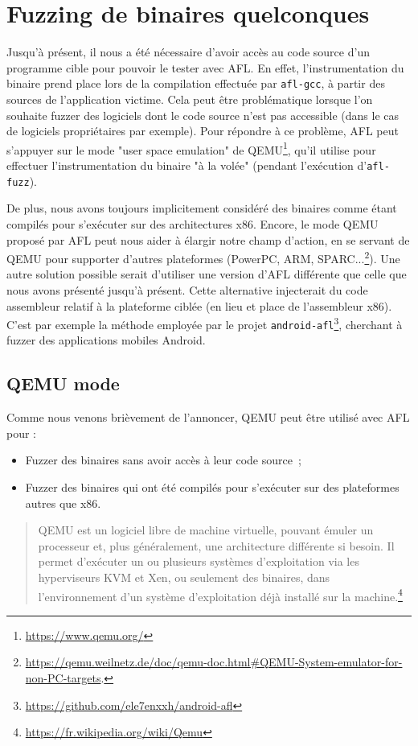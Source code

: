 \chapter{Fuzzing de binaires quelconques}

Jusqu'à présent, il nous a été nécessaire d'avoir accès au code source d'un programme cible pour pouvoir le tester avec AFL.
En effet, l'instrumentation du binaire prend place lors de la compilation effectuée par \lstinline{afl-gcc}, à partir des sources de l'application victime.
Cela peut être problématique lorsque l'on souhaite fuzzer des logiciels dont le code source n'est pas accessible (dans le cas de logiciels propriétaires par exemple).
Pour répondre à ce problème, AFL peut s'appuyer sur le mode "user space emulation" de QEMU\footnote{\url{https://www.qemu.org/}}, qu'il utilise pour effectuer l'instrumentation du binaire "à la volée" (pendant l'exécution d'\lstinline{afl-fuzz}).

De plus, nous avons toujours implicitement considéré des binaires comme étant compilés pour s'exécuter sur des architectures x86.
Encore, le mode QEMU proposé par AFL peut nous aider à élargir notre champ d'action, en se servant de QEMU pour supporter d'autres plateformes (PowerPC, ARM, SPARC...\footnote{\url{https://qemu.weilnetz.de/doc/qemu-doc.html\#QEMU-System-emulator-for-non-PC-targets}.}).
Une autre solution possible serait d'utiliser une version d'AFL différente que celle que nous avons présenté jusqu'à présent.
Cette alternative injecterait du code assembleur relatif à la plateforme ciblée (en lieu et place de l'assembleur x86).
C'est par exemple la méthode employée par le projet \lstinline{android-afl}\footnote{\url{https://github.com/ele7enxxh/android-afl}}, cherchant à fuzzer des applications mobiles Android.

\section{QEMU mode}

Comme nous venons brièvement de l'annoncer, QEMU peut être utilisé avec AFL pour :
\begin{itemize}
  \item{} Fuzzer des binaires sans avoir accès à leur code source ;
  \item{} Fuzzer des binaires qui ont été compilés pour s'exécuter sur des plateformes autres que x86.
\end{itemize}

\begin{quote}
QEMU est un logiciel libre de machine virtuelle, pouvant émuler un processeur et, plus généralement, une architecture différente si besoin. Il permet d'exécuter un ou plusieurs systèmes d'exploitation via les hyperviseurs KVM et Xen, ou seulement des binaires, dans l'environnement d'un système d'exploitation déjà installé sur la machine.\footnote{\url{https://fr.wikipedia.org/wiki/Qemu}}
\end{quote}

